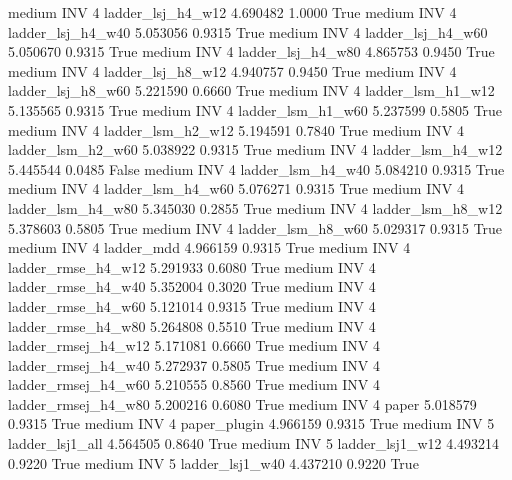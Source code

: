     medium      INV                 4   ladder_lsj_h4_w12   4.690482      1.0000    True
    medium      INV                 4   ladder_lsj_h4_w40   5.053056      0.9315    True
    medium      INV                 4   ladder_lsj_h4_w60   5.050670      0.9315    True
    medium      INV                 4   ladder_lsj_h4_w80   4.865753      0.9450    True
    medium      INV                 4   ladder_lsj_h8_w12   4.940757      0.9450    True
    medium      INV                 4   ladder_lsj_h8_w60   5.221590      0.6660    True
    medium      INV                 4   ladder_lsm_h1_w12   5.135565      0.9315    True
    medium      INV                 4   ladder_lsm_h1_w60   5.237599      0.5805    True
    medium      INV                 4   ladder_lsm_h2_w12   5.194591      0.7840    True
    medium      INV                 4   ladder_lsm_h2_w60   5.038922      0.9315    True
    medium      INV                 4   ladder_lsm_h4_w12   5.445544      0.0485   False
    medium      INV                 4   ladder_lsm_h4_w40   5.084210      0.9315    True
    medium      INV                 4   ladder_lsm_h4_w60   5.076271      0.9315    True
    medium      INV                 4   ladder_lsm_h4_w80   5.345030      0.2855    True
    medium      INV                 4   ladder_lsm_h8_w12   5.378603      0.5805    True
    medium      INV                 4   ladder_lsm_h8_w60   5.029317      0.9315    True
    medium      INV                 4          ladder_mdd   4.966159      0.9315    True
    medium      INV                 4  ladder_rmse_h4_w12   5.291933      0.6080    True
    medium      INV                 4  ladder_rmse_h4_w40   5.352004      0.3020    True
    medium      INV                 4  ladder_rmse_h4_w60   5.121014      0.9315    True
    medium      INV                 4  ladder_rmse_h4_w80   5.264808      0.5510    True
    medium      INV                 4 ladder_rmsej_h4_w12   5.171081      0.6660    True
    medium      INV                 4 ladder_rmsej_h4_w40   5.272937      0.5805    True
    medium      INV                 4 ladder_rmsej_h4_w60   5.210555      0.8560    True
    medium      INV                 4 ladder_rmsej_h4_w80   5.200216      0.6080    True
    medium      INV                 4               paper   5.018579      0.9315    True
    medium      INV                 4        paper_plugin   4.966159      0.9315    True
    medium      INV                 5     ladder_lsj1_all   4.564505      0.8640    True
    medium      INV                 5     ladder_lsj1_w12   4.493214      0.9220    True
    medium      INV                 5     ladder_lsj1_w40   4.437210      0.9220    True
